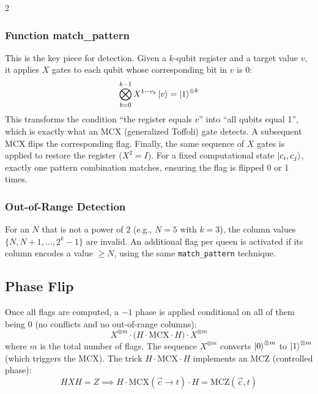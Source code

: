 \documentclass[9pt, a4paper]{extarticle}
\begin{document}
\begin{multicols}{2}
\subsubsection{Function match\_pattern}

This is the key piece for detection. Given a $k$-qubit register and a target value $v$, it applies $X$ gates to each qubit whose corresponding bit in $v$ is 0:
\begin{equation}
    \bigotimes_{b=0}^{k-1} X^{1-v_b} \ket{v} = \ket{1}^{\otimes k}
\end{equation}
This transforms the condition ``the register equals $v$'' into ``all qubits equal 1'', which is exactly what an MCX (generalized Toffoli) gate detects. A subsequent MCX flips the corresponding flag. Finally, the same sequence of $X$ gates is applied to restore the register ($X^2 = I$).
For a fixed computational state $\ket{c_i, c_j}$, exactly one pattern combination matches, ensuring the flag is flipped 0 or 1 times.

\subsubsection{Out-of-Range Detection}

For an $N$ that is not a power of 2 (e.g., $N = 5$ with $k = 3$), the column values $\{N, N{+}1, \ldots, 2^k{-}1\}$ are invalid. An additional flag per queen is activated if its column encodes a value $\geq N$, using the same \texttt{match\_pattern} technique.

\subsection{Phase Flip}

Once all flags are computed, a $-1$ phase is applied conditional on all of them being 0 (no conflicts and no out-of-range columns):
\begin{equation}
    X^{\otimes m}\!\cdot\!\big(H\!\cdot\!\text{MCX}\!\cdot\!H\big)\!\cdot\!X^{\otimes m}
\end{equation}
where $m$ is the total number of flags. The sequence $X^{\otimes m}$ converts $\ket{0}^{\otimes m}$ to $\ket{1}^{\otimes m}$ (which triggers the MCX). The trick $H \cdot \text{MCX} \cdot H$ implements an MCZ (controlled phase):
\begin{equation}
    HXH = Z \implies H \cdot \text{MCX}(\vec{c} \to t) \cdot H = \text{MCZ}(\vec{c}, t)
\end{equation}


\end{multicols}
\end{document}
